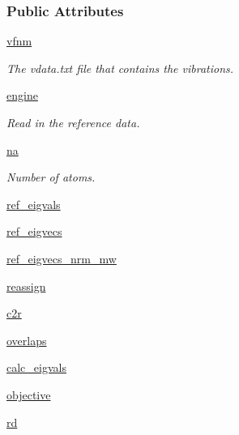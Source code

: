 \subsubsection*{Public Attributes}
\begin{DoxyCompactItemize}
\item 
\hyperlink{classforcebalance_1_1vibration_1_1Vibration_a50552dbdadc7a86aaab97bfdcf85e449}{vfnm}
\begin{DoxyCompactList}\small\item\em The vdata.\-txt file that contains the vibrations. \end{DoxyCompactList}\item 
\hyperlink{classforcebalance_1_1vibration_1_1Vibration_ad72d6182d9f2d2a1ba97030635fbdb3d}{engine}
\begin{DoxyCompactList}\small\item\em Read in the reference data. \end{DoxyCompactList}\item 
\hyperlink{classforcebalance_1_1vibration_1_1Vibration_a31148c4d3157dddf2485c4e63496e120}{na}
\begin{DoxyCompactList}\small\item\em Number of atoms. \end{DoxyCompactList}\item 
\hyperlink{classforcebalance_1_1vibration_1_1Vibration_ab9913cb05e66e53a5781237baf9ea2e1}{ref\-\_\-eigvals}
\item 
\hyperlink{classforcebalance_1_1vibration_1_1Vibration_ae9c5479bd3b01ecb3d2d40a9487ccac5}{ref\-\_\-eigvecs}
\item 
\hyperlink{classforcebalance_1_1vibration_1_1Vibration_a6b2b9f1e95bea0edabd46ada819cd005}{ref\-\_\-eigvecs\-\_\-nrm\-\_\-mw}
\item 
\hyperlink{classforcebalance_1_1vibration_1_1Vibration_a6dc3e340d09d4adc415eee905c75b6cc}{reassign}
\item 
\hyperlink{classforcebalance_1_1vibration_1_1Vibration_aadf038fadc7a0d1ca03ba225ebf7edb6}{c2r}
\item 
\hyperlink{classforcebalance_1_1vibration_1_1Vibration_a9ce45d9b33c510d6c1bc78f5f09b1981}{overlaps}
\item 
\hyperlink{classforcebalance_1_1vibration_1_1Vibration_a465150971ac24aabbf40b1f50b304f6e}{calc\-\_\-eigvals}
\item 
\hyperlink{classforcebalance_1_1vibration_1_1Vibration_a78813cc16da8d8c6a8113e3301c96c0d}{objective}
\item 
\hyperlink{classforcebalance_1_1target_1_1Target_a4edb69fbde792e9f2f27e54b7c978c8e}{rd}

\end{DoxyCompactItemize}
